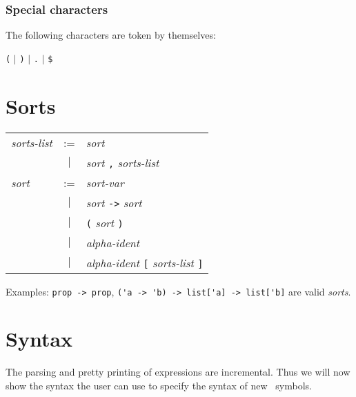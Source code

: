 \subsubsection*{Special characters}

The following characters are token by themselves:

\begin{center}
  \verb#(# $|$ \verb#)# $|$ \verb#.# $|$ \verb#$# 
\end{center}

\section{Sorts}

\begin{center}
\begin{tabular}{lcl}
  {\it sorts-list} &:=& {\it sort} \\ &$|$& {\it sort} \verb#,# {\it
  sorts-list} \\
  {\it sort} &:=& {\it sort-var} \\
             &$|$& {\it sort} \verb#-># {\it sort} \\
             &$|$& \verb#(# {\it sort} \verb#)# \\
             &$|$& {\it alpha-ident} \\
             &$|$& {\it alpha-ident} \verb#[# {\it sorts-list} \verb#]#  \\
\end{tabular}
\end{center}           

\medskip
\noindent Examples: \verb#prop -> prop#,
\verb#('a -> 'b) -> list['a] -> list['b]# are valid {\it sorts}.


\section{Syntax}

The parsing and pretty printing of expressions are incremental. Thus we will
now show the syntax the user can use to specify the syntax of new \AFD\ symbols.

